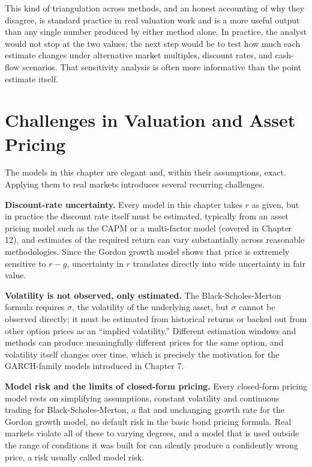 \documentclass[../ai_in_finance]{subfiles}
\begin{document}
This kind of triangulation across methods, and an honest accounting of why they disagree, is standard practice in real valuation work and is a more useful output than any single number produced by either method alone. In practice, the analyst would not stop at the two values; the next step would be to test how much each estimate changes under alternative market multiples, discount rates, and cash-flow scenarios. That sensitivity analysis is often more informative than the point estimate itself.

\section{Challenges in Valuation and Asset Pricing}

The models in this chapter are elegant and, within their assumptions, exact. Applying them to real markets introduces several recurring challenges.

\textbf{Discount-rate uncertainty.} Every model in this chapter takes $r$ as given, but in practice the discount rate itself must be estimated, typically from an asset pricing model such as the CAPM or a multi-factor model (covered in Chapter 12), and estimates of the required return can vary substantially across reasonable methodologies. Since the Gordon growth model shows that price is extremely sensitive to $r-g$, uncertainty in $r$ translates directly into wide uncertainty in fair value.

\textbf{Volatility is not observed, only estimated.} The Black-Scholes-Merton formula requires $\sigma$, the volatility of the underlying asset, but $\sigma$ cannot be observed directly; it must be estimated from historical returns or backed out from other option prices as an ``implied volatility.'' Different estimation windows and methods can produce meaningfully different prices for the same option, and volatility itself changes over time, which is precisely the motivation for the GARCH-family models introduced in Chapter 7.

\textbf{Model risk and the limits of closed-form pricing.} Every closed-form pricing model rests on simplifying assumptions, constant volatility and continuous trading for Black-Scholes-Merton, a flat and unchanging growth rate for the Gordon growth model, no default risk in the basic bond pricing formula. Real markets violate all of these to varying degrees, and a model that is used outside the range of conditions it was built for can silently produce a confidently wrong price, a risk usually called model risk.
\end{document}
